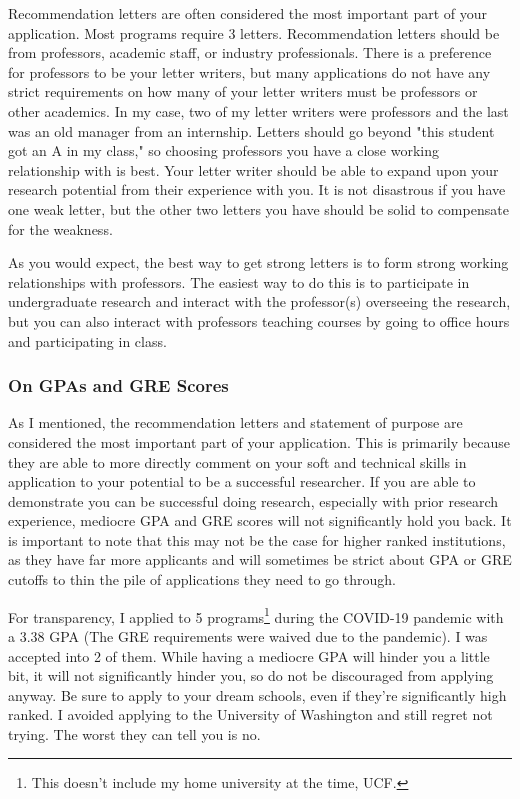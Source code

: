 \documentclass[12pt]{article}
\begin{document}
Recommendation letters are often considered the most important part of your application. Most programs require 3 letters. Recommendation letters should be from professors, academic staff, or industry professionals. There is a preference for professors to be your letter writers, but many applications do not have any strict requirements on how many of your letter writers must be professors or other academics. In my case, two of my letter writers were professors and the last was an old manager from an internship. Letters should go beyond "this student got an A in my class," so choosing professors you have a close working relationship with is best. Your letter writer should be able to expand upon your research potential from their experience with you. It is not disastrous if you have one weak letter, but the other two letters you have should be solid to compensate for the weakness.

As you would expect, the best way to get strong letters is to form strong working relationships with professors. The easiest way to do this is to participate in undergraduate research and interact with the professor(s) overseeing the research, but you can also interact with professors teaching courses by going to office hours and participating in class.

\subsubsection{On GPAs and GRE Scores}

As I mentioned, the recommendation letters and statement of purpose are considered the most important part of your application. This is primarily because they are able to more directly comment on your soft and technical skills in application to your potential to be a successful researcher. If you are able to demonstrate you can be successful doing research, especially with prior research experience, mediocre GPA and GRE scores will not significantly hold you back. It is important to note that this may not be the case for higher ranked institutions, as they have far more applicants and will sometimes be strict about GPA or GRE cutoffs to thin the pile of applications they need to go through. 

For transparency, I applied to 5 programs\footnote{This doesn't include my home university at the time, UCF.} during the COVID-19 pandemic with a 3.38 GPA (The GRE requirements were waived due to the pandemic). I was accepted into 2 of them. While having a mediocre GPA will hinder you a little bit, it will not significantly hinder you, so do not be discouraged from applying anyway. Be sure to apply to your dream schools, even if they're significantly high ranked. I avoided applying to the University of Washington and still regret not trying. The worst they can tell you is no.
\end{document}
